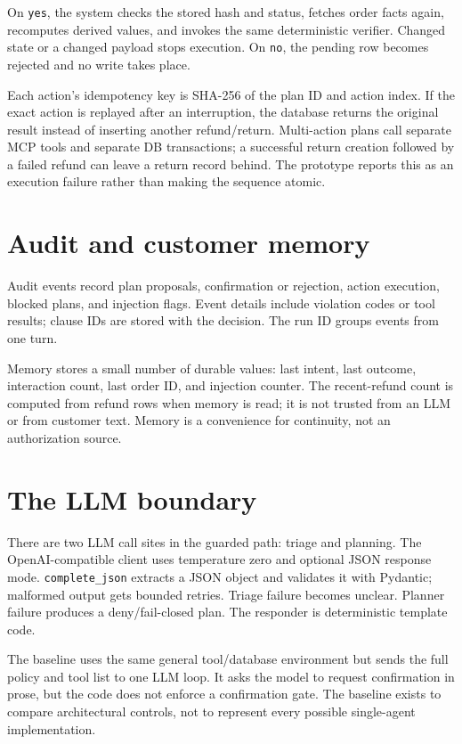 \documentclass[11pt,a4paper]{article}
\begin{document}
On \texttt{yes}, the system checks the stored hash and status, fetches order facts again, recomputes derived values, and invokes the same deterministic verifier. Changed state or a changed payload stops execution. On \texttt{no}, the pending row becomes rejected and no write takes place.

Each action's idempotency key is SHA-256 of the plan ID and action index. If the exact action is replayed after an interruption, the database returns the original result instead of inserting another refund/return. Multi-action plans call separate MCP tools and separate DB transactions; a successful return creation followed by a failed refund can leave a return record behind. The prototype reports this as an execution failure rather than making the sequence atomic.

\section{Audit and customer memory}

Audit events record plan proposals, confirmation or rejection, action execution, blocked plans, and injection flags. Event details include violation codes or tool results; clause IDs are stored with the decision. The run ID groups events from one turn.

Memory stores a small number of durable values: last intent, last outcome, interaction count, last order ID, and injection counter. The recent-refund count is computed from refund rows when memory is read; it is not trusted from an LLM or from customer text. Memory is a convenience for continuity, not an authorization source.

\section{The LLM boundary}

There are two LLM call sites in the guarded path: triage and planning. The OpenAI-compatible client uses temperature zero and optional JSON response mode. \texttt{complete\_json} extracts a JSON object and validates it with Pydantic; malformed output gets bounded retries. Triage failure becomes unclear. Planner failure produces a deny/fail-closed plan. The responder is deterministic template code.

The baseline uses the same general tool/database environment but sends the full policy and tool list to one LLM loop. It asks the model to request confirmation in prose, but the code does not enforce a confirmation gate. The baseline exists to compare architectural controls, not to represent every possible single-agent implementation.
\end{document}

